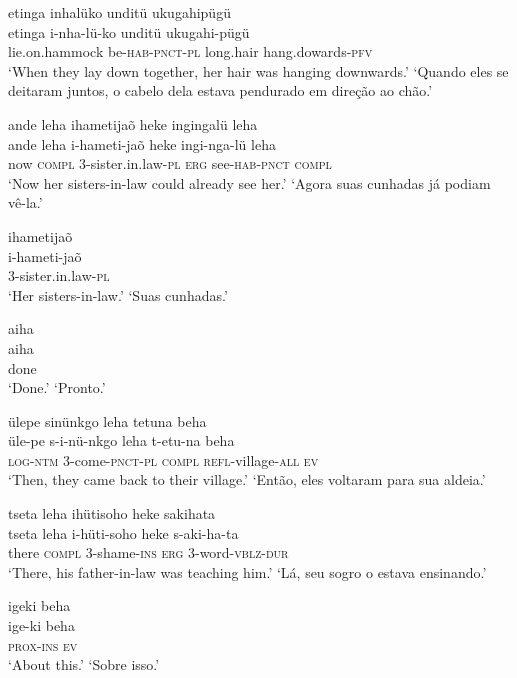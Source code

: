 \documentclass[output=paper,
modfonts,nonflat
]{langsci/langscibook}
\begin{document}
\ea  etinga inhalüko unditü ukugahipügü\\[.3em]
\gll etinga i-nha-lü-ko unditü ukugahi-pügü\\
     lie.on.hammock be-\textsc{hab}-\textsc{pnct}-\textsc{pl} long.hair hang.dowards-\textsc{pfv}\\
\glt ‘When they lay down together, her hair was hanging downwards.’
\glt ‘Quando eles se deitaram juntos, o cabelo dela estava pendurado em direção ao chão.’
\z

\ea  ande leha ihametijaõ heke ingingalü leha\\[.3em]
\gll ande leha i-hameti-jaõ heke ingi-nga-lü leha\\
     now \textsc{compl} 3-sister.in.law-\textsc{pl} \textsc{erg} see-\textsc{hab}-\textsc{pnct} \textsc{compl}\\
\glt ‘Now her sisters-in-law could already see her.’
\glt ‘Agora suas cunhadas já podiam vê-la.’
\z

\ea  ihametijaõ\\[.3em]
\gll i-hameti-jaõ\\
     3-sister.in.law-\textsc{pl}\\
\glt ‘Her sisters-in-law.’
\glt ‘Suas cunhadas.’
\z

\ea  aiha\\[.3em]
\gll aiha\\
     done\\
\glt ‘Done.’
\glt ‘Pronto.’
\z

\ea  ülepe sinünkgo leha tetuna beha\\[.3em]
\gll üle-pe s-i-nü-nkgo leha t-etu-na beha\\
     \textsc{log}-\textsc{ntm} 3-come-\textsc{pnct}-\textsc{pl} \textsc{compl} \textsc{refl}-village-\textsc{all} \textsc{ev}\\
\glt ‘Then, they came back to their village.’
\glt ‘Então, eles voltaram para sua aldeia.’
\z

\ea  tseta leha ihütisoho heke sakihata\\[.3em]
\gll tseta leha i-hüti-soho heke s-aki-ha-ta\\
     there \textsc{compl} 3-shame-\textsc{ins} \textsc{erg} 3-word-\textsc{vblz}-\textsc{dur}\\
\glt ‘There, his father-in-law was teaching him.’
\glt ‘Lá, seu sogro o estava ensinando.’
\z

\ea  igeki beha\\[.3em]
\gll ige-ki beha\\
     \textsc{prox}-\textsc{ins} \textsc{ev}\\
\glt ‘About this.’
\glt ‘Sobre isso.’
\z
\end{document}
